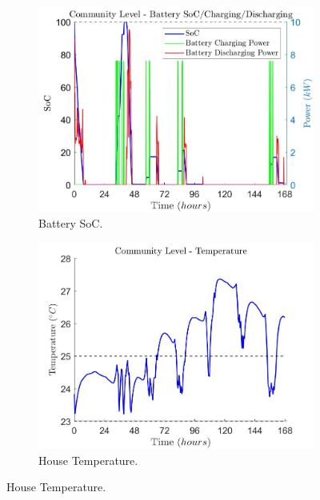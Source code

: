 \documentclass[11pt,usenames]{article}
\begin{document}
\begin{figure}[!t]
	\centering
	\begin{subfigure}[t]{0.48\textwidth}
		\centering
		\includegraphics[scale=0.3]{Gainesville_BaseLine_7DayTest_SC_PVBat1_Bat1_PV1_None1_SCL1_Community_Bat_SoC_C_DisC.JPG}
		\caption{Battery SoC.}
		\label{fig:Bat_2}
	\end{subfigure}
	\begin{subfigure}[t]{0.48\textwidth}
		\centering
		\includegraphics[scale=0.3]{Gainesville_BaseLine_7DayTest_SC_PVBat1_Bat1_PV1_None1_SCL1_Community_Temperature.JPG}
		\caption{House Temperature.}
		\label{fig:Temp_2}
	\end{subfigure}
	

\end{figure}
\end{document}
